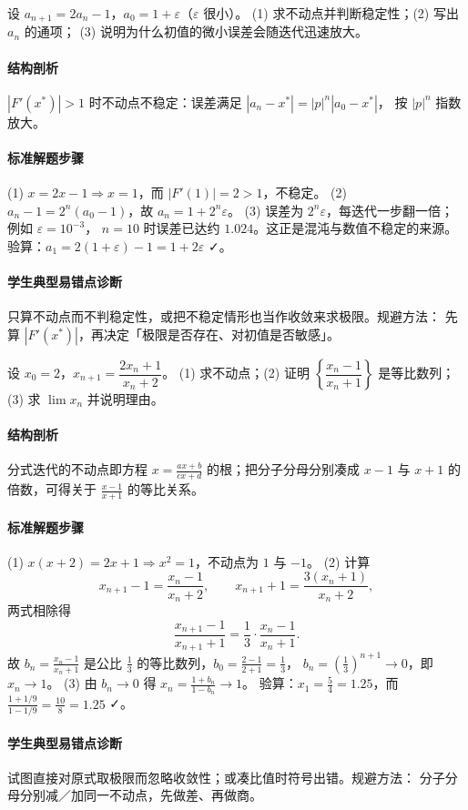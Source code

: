\begin{problem}
设 $a_{n+1}=2a_n-1$，$a_0=1+\varepsilon$（$\varepsilon$ 很小）。
(1) 求不动点并判断稳定性；(2) 写出 $a_n$ 的通项；
(3) 说明为什么初值的微小误差会随迭代迅速放大。
\end{problem}
\begin{solution}
\paragraph{结构剖析}
$|F'(x^*)|>1$ 时不动点不稳定：误差满足 $|a_n-x^*|=|p|^n|a_0-x^*|$，
按 $|p|^n$ 指数放大。
\paragraph{标准解题步骤}
(1) $x=2x-1\Rightarrow x=1$，而 $|F'(1)|=2>1$，不稳定。
(2) $a_n-1=2^n(a_0-1)$，故 $a_n=1+2^n\varepsilon$。
(3) 误差为 $2^n\varepsilon$，每迭代一步翻一倍；例如 $\varepsilon=10^{-3}$，
$n=10$ 时误差已达约 $1.024$。这正是混沌与数值不稳定的来源。
验算：$a_1=2(1+\varepsilon)-1=1+2\varepsilon$ ✓。
\paragraph{学生典型易错点诊断}
只算不动点而不判稳定性，或把不稳定情形也当作收敛来求极限。规避方法：
先算 $|F'(x^*)|$，再决定「极限是否存在、对初值是否敏感」。
\end{solution}

\begin{problem}
设 $x_0=2$，$x_{n+1}=\dfrac{2x_n+1}{x_n+2}$。
(1) 求不动点；(2) 证明 $\left\{\dfrac{x_n-1}{x_n+1}\right\}$ 是等比数列；
(3) 求 $\lim x_n$ 并说明理由。
\end{problem}
\begin{solution}
\paragraph{结构剖析}
分式迭代的不动点即方程 $x=\frac{ax+b}{cx+d}$ 的根；把分子分母分别凑成
$x-1$ 与 $x+1$ 的倍数，可得关于 $\frac{x-1}{x+1}$ 的等比关系。
\paragraph{标准解题步骤}
(1) $x(x+2)=2x+1\Rightarrow x^2=1$，不动点为 $1$ 与 $-1$。
(2) 计算
\[
  x_{n+1}-1=\frac{x_n-1}{x_n+2},\qquad
  x_{n+1}+1=\frac{3(x_n+1)}{x_n+2},
\]
两式相除得
\[
  \frac{x_{n+1}-1}{x_{n+1}+1}=\frac13\cdot\frac{x_n-1}{x_n+1}.
\]
故 $b_n=\frac{x_n-1}{x_n+1}$ 是公比 $\frac13$ 的等比数列，$b_0=\frac{2-1}{2+1}=\frac13$，
$b_n=\left(\frac13\right)^{n+1}\to0$，即 $x_n\to1$。
(3) 由 $b_n\to0$ 得 $x_n=\frac{1+b_n}{1-b_n}\to1$。
验算：$x_1=\frac{5}{4}=1.25$，而 $\frac{1+1/9}{1-1/9}=\frac{10}{8}=1.25$ ✓。
\paragraph{学生典型易错点诊断}
试图直接对原式取极限而忽略收敛性；或凑比值时符号出错。规避方法：
分子分母分别减／加同一不动点，先做差、再做商。
\end{solution}

